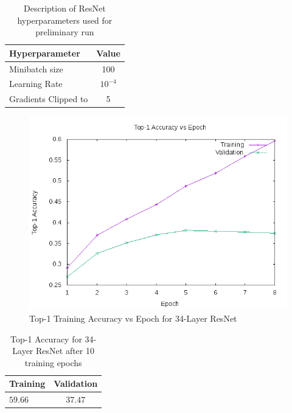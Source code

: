 \documentclass[10pt,twocolumn,letterpaper]{article}
\begin{document}
\begin{table}
\begin{center}
\begin{tabular}{|l|c|}
\hline
Hyperparameter & Value \\
\hline\hline
Minibatch size & 100 \\
Learning Rate & $10^{-4}$\\
Gradients Clipped to & 5\\
\hline
\end{tabular}
\end{center}
\caption{Description of ResNet hyperparameters used for preliminary run}
\label{table:hyper}
\end{table}

\begin{figure}[t]
\begin{center}
  \includegraphics[width=0.8\linewidth]{accuracy_resnet34}
\end{center}
   \caption{Top-1 Training Accuracy vs Epoch for 34-Layer ResNet}
\label{fig:top1-resnet34}
\end{figure}

\begin{table}
\begin{center}
\begin{tabular}{|l|c|}
\hline
Training & Validation \\
\hline\hline
$59.66$ & $37.47$\\
\hline
\end{tabular}
\end{center}
\caption{Top-1 Accuracy for 34-Layer ResNet after 10 training epochs}
\label{table:acc}
\end{table}
\end{document}
